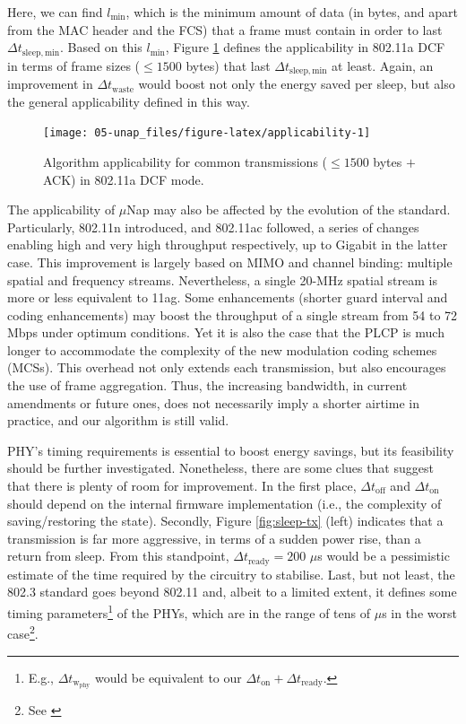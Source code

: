 \documentclass[twoside,nohyper]{tufte-book}
\theoremstyle{definition}
\theoremstyle{definition}
\theoremstyle{definition}
\theoremstyle{remark}
\begin{document}
Here, we can find \(l_\mathrm{min}\), which is the minimum amount of
data (in bytes, and apart from the MAC header and the FCS) that a frame
must contain in order to last \(\Delta t_\mathrm{sleep,min}\). Based on
this \(l_\mathrm{min}\), Figure \ref{fig:applicability} defines the
applicability in 802.11a DCF in terms of frame sizes (\(\le 1500\)
bytes) that last \(\Delta t_\mathrm{sleep,min}\) at least. Again, an
improvement in \(\Delta t_\mathrm{waste}\) would boost not only the
energy saved per sleep, but also the general applicability defined in
this way.




\begin{figure}

{\centering \texttt{[image: 05-unap\_files/figure-latex/applicability-1]} 

}

\caption[Algorithm applicability for common transmissions
(\(\le 1500\) bytes \(+\) ACK) in 802.11a DCF mode.]{Algorithm applicability for common transmissions
(\(\le 1500\) bytes \(+\) ACK) in 802.11a DCF mode.}\label{fig:applicability}
\end{figure}

The applicability of \(\mu\)Nap may also be affected by the evolution of
the standard. Particularly, 802.11n introduced, and 802.11ac followed, a
series of changes enabling high and very high throughput respectively,
up to Gigabit in the latter case. This improvement is largely based on
MIMO and channel binding: multiple spatial and frequency streams.
Nevertheless, a single 20-MHz spatial stream is more or less equivalent
to 11ag. Some enhancements (shorter guard interval and coding
enhancements) may boost the throughput of a single stream from 54 to 72
Mbps under optimum conditions. Yet it is also the case that the PLCP is
much longer to accommodate the complexity of the new modulation coding
schemes (MCSs). This overhead not only extends each transmission, but
also encourages the use of frame aggregation. Thus, the increasing
bandwidth, in current amendments or future ones, does not necessarily
imply a shorter airtime in practice, and our algorithm is still valid.

 PHY's timing requirements is essential to boost
energy savings, but its feasibility should be further investigated.
Nonetheless, there are some clues that suggest that there is plenty of
room for improvement. In the first place, \(\Delta t_\mathrm{off}\) and
\(\Delta t_\mathrm{on}\) should depend on the internal firmware
implementation (i.e., the complexity of saving/restoring the state).
Secondly, Figure \ref{fig:sleep-tx} (left) indicates that a transmission
is far more aggressive, in terms of a sudden power rise, than a return
from sleep. From this standpoint, \(\Delta t_\mathrm{ready} = 200\)
\(\mu\)s would be a pessimistic estimate of the time required by the
circuitry to stabilise. Last, but not least, the 802.3 standard goes
beyond 802.11 and, albeit to a limited extent, it defines some timing
parameters\footnote{E.g., \(\Delta t_\mathrm{w_{phy}}\) would be
  equivalent to our \(\Delta t_\mathrm{on}+\Delta t_\mathrm{ready}\).}
of the PHYs, which are in the range of tens of \(\mu\)s in the worst
case\footnote{See \citet[Table 78-4]{8023}}.
\end{document}
